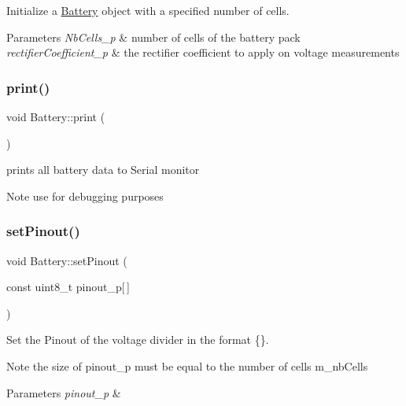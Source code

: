 Initialize a \hyperlink{class_battery}{Battery} object with a specified number of cells. 


\begin{DoxyParams}{Parameters}
{\em Nb\+Cells\+\_\+p} & number of cells of the battery pack \\
\hline
{\em rectifier\+Coefficient\+\_\+p} & the rectifier coefficient to apply on voltage measurements \\
\hline
\end{DoxyParams}
\mbox{\label{class_battery_a66ad0266d08fe7d72c90d54654dffcea}} 
\subsubsection{\texorpdfstring{print()}{print()}}
{\footnotesize\ttfamily void Battery\+::print (\begin{DoxyParamCaption}{ }\end{DoxyParamCaption})}



prints all battery data to Serial monitor 

\begin{DoxyNote}{Note}
use for debugging purposes 
\end{DoxyNote}
\mbox{\label{class_battery_a580d9582fbcf2c5f8185e3007852f73d}} 
\subsubsection{\texorpdfstring{set\+Pinout()}{setPinout()}}
{\footnotesize\ttfamily void Battery\+::set\+Pinout (\begin{DoxyParamCaption}\item[{const uint8\+\_\+t}]{pinout\+\_\+p\mbox{[}$\,$\mbox{]} }\end{DoxyParamCaption})}



Set the Pinout of the voltage divider in the format \{\}. 

\begin{DoxyNote}{Note}
the size of pinout\+\_\+p must be equal to the number of cells m\+\_\+nb\+Cells 
\end{DoxyNote}

\begin{DoxyParams}{Parameters}
{\em pinout\+\_\+p} & \\
\hline
\end{DoxyParams}
\mbox{\label{class_battery_afb257ecd2eab7ed446d15ea9e78cc074}} 
